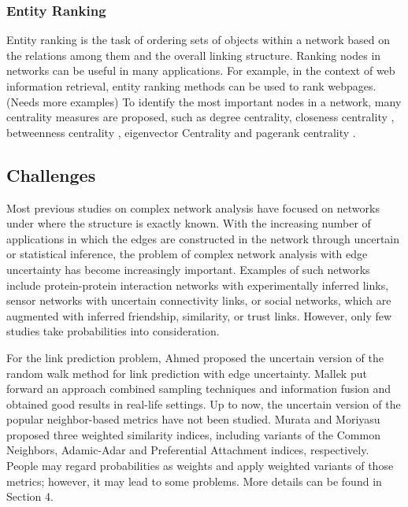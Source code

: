 \documentclass[\main/thesis.tex]{subfiles}
\begin{document}
\subsubsection{Entity Ranking}
Entity ranking is the task of ordering sets of objects within a network based on the relations among them and the overall linking structure. Ranking nodes in networks can be useful in many applications. For example, in the context of web information retrieval, entity ranking methods can be used to rank webpages. (Needs more examples) To identify the most important nodes in a network, many centrality measures are proposed, such as degree centrality, closeness centrality \cite{freeman1978centrality}, betweenness centrality \cite{freeman1977set}, eigenvector Centrality \cite{bonacich1987power} and pagerank centrality \cite{page1999pagerank}.

\subsection{Challenges}
Most previous studies on complex network analysis have focused on networks under where the structure is exactly known. With the increasing number of applications in which the edges  are  constructed  in  the  network  through  uncertain  or statistical  inference,  the  problem  of  complex network analysis with edge uncertainty has become increasingly important. Examples of such networks  include  protein-protein  interaction  networks  with experimentally inferred links, sensor networks with  uncertain  connectivity  links,  or  social  networks, which are augmented with inferred friendship, similarity, or trust links. However, only few studies take probabilities into consideration. 

For the link prediction problem, Ahmed \cite{ahmed2016efficient} proposed the uncertain version of the random walk method for link prediction with edge uncertainty. Mallek \cite{mallek2016evidential} put forward an approach combined sampling techniques and information fusion and obtained good results in real-life settings. Up to now, the uncertain version of the popular neighbor-based metrics have not been studied. Murata and Moriyasu \cite{murata2007link} proposed three weighted similarity indices, including variants of the Common Neighbors, Adamic-Adar and Preferential Attachment indices, respectively. People may regard probabilities as weights and apply weighted variants of those metrics; however, it may lead to some problems. More details can be found in Section 4.
\end{document}
